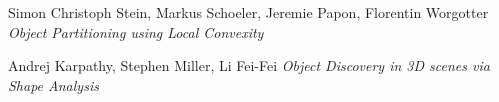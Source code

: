 \documentclass[conference]{IEEEtran}
\begin{document}


%
%
%
\begin{thebibliography}{1}

  Simon Christoph Stein, Markus Schoeler, Jeremie Papon, Florentin Worgotter
  \emph{Object Partitioning using Local Convexity}

  Andrej Karpathy, Stephen Miller, Li Fei-Fei
  \emph{Object Discovery in 3D scenes via Shape Analysis}

\end{thebibliography}




\end{document}
